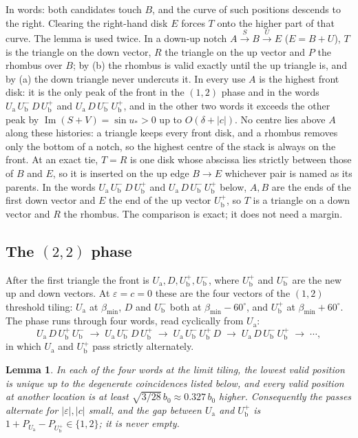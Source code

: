 \documentclass[11pt]{amsart}
\newtheorem{lemma}{Lemma}[section]
\theoremstyle{definition}
\newcommand{\eps}{\varepsilon}
\newcommand{\Ua}{U_{\mathrm a}}
\newcommand{\Ub}{U_{\mathrm b}}
\newcommand{\up}[1]{#1^{+}}
\newcommand{\dn}[1]{#1^{-}}
\DeclareMathOperator{\Imag}{Im}
\begin{document}
\noindent In words: both candidates touch $B$, and the curve of such positions descends to the right. Clearing
the right-hand disk $E$ forces $T$ onto the higher part of that curve. The lemma is used twice. In a down-up
notch $A\xrightarrow{S}B\xrightarrow{U}E$ ($E=B+U$), $T$ is the triangle on the down vector, $R$ the
triangle on the up vector and $P$ the rhombus over $B$; by (b) the rhombus is valid exactly until the up
triangle is, and by (a) the down triangle never undercuts it. In every use $A$ is the highest front disk: it
is the only peak of the front in the $(1,2)$ phase and in the words $\Ua\,\dn{\Ub}\,D\,\up{\Ub}$ and
$\Ua\,D\,\dn{\Ub}\,\up{\Ub}$, and in the other two words it exceeds the other peak by
$\Imag(S+V)=\sin u_*>0$ up to $O(\delta+|c|)$. No centre lies above $A$ along these histories: a triangle keeps
every front disk, and a rhombus removes only the bottom of a notch, so the highest centre of the stack is
always on the front. At an exact tie, $T=R$ is one disk whose abscissa lies strictly between those of $B$ and
$E$, so it is inserted on the up edge $B\to E$ whichever pair is named as its parents. In the words $\Ua\,\dn{\Ub}\,D\,\up{\Ub}$ and $\Ua\,D\,\dn{\Ub}\,\up{\Ub}$ below,
$A,B$ are the ends of the first down vector and $E$ the end of the up vector $\up{\Ub}$, so $T$ is a triangle
on a down vector and $R$ the rhombus. The comparison is exact; it does not need a margin.

\subsection{The \texorpdfstring{$(2,2)$}{(2,2)} phase} After the first triangle the front is $\Ua,D,\up{\Ub},\dn{\Ub}$,
where $\up{\Ub}$ and $\dn{\Ub}$ are the new up and down vectors. At $\eps=c=0$ these are the four vectors of
the $(1,2)$ threshold tiling: $\Ua$ at $\beta_{\min}$, $D$ and $\dn{\Ub}$ both at $\beta_{\min}-60^\circ$, and
$\up{\Ub}$ at $\beta_{\min}+60^\circ$. The phase runs through four words, read cyclically from $\Ua$:
\[
\Ua\,D\,\up{\Ub}\,\dn{\Ub}\;\to\;\Ua\,\dn{\Ub}\,D\,\up{\Ub}\;\to\;\Ua\,\dn{\Ub}\,\up{\Ub}\,D
\;\to\;\Ua\,D\,\dn{\Ub}\,\up{\Ub}\;\to\;\cdots,
\]
in which $\Ua$ and $\up{\Ub}$ pass strictly alternately.

\begin{lemma}\label{lem:alternation}
In each of the four words at the limit tiling, the lowest valid position is unique up to the
degenerate coincidences listed below, and every valid position at another location is at least
$\sqrt{3/28}\,b_0\approx0.327\,b_0$ higher. Consequently the passes alternate for $|\eps|,|c|$ small, and
the gap between $\Ua$ and $\up{\Ub}$ is $1+P_{\Ua}-P_{\up{\Ub}}\in\{1,2\}$; it is never empty.
\end{lemma}
\end{document}
